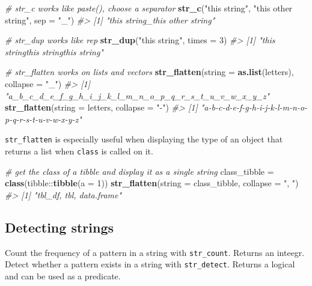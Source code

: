 \documentclass[]{book}
\newenvironment{Shaded}{}{}
\newcommand{\CommentTok}[1]{\textcolor[rgb]{0.38,0.63,0.69}{\textit{#1}}}
\newcommand{\DataTypeTok}[1]{\textcolor[rgb]{0.56,0.13,0.00}{#1}}
\newcommand{\DecValTok}[1]{\textcolor[rgb]{0.25,0.63,0.44}{#1}}
\newcommand{\KeywordTok}[1]{\textcolor[rgb]{0.00,0.44,0.13}{\textbf{#1}}}
\newcommand{\NormalTok}[1]{#1}
\newcommand{\OperatorTok}[1]{\textcolor[rgb]{0.40,0.40,0.40}{#1}}
\newcommand{\StringTok}[1]{\textcolor[rgb]{0.25,0.44,0.63}{#1}}
\begin{document}
\begin{Shaded}
\begin{Highlighting}[]
\CommentTok{# str_c works like paste(), choose a separator}
\KeywordTok{str_c}\NormalTok{(}\StringTok{"this string"}\NormalTok{, }\StringTok{"this other string"}\NormalTok{, }\DataTypeTok{sep =} \StringTok{"_"}\NormalTok{)}
\CommentTok{#> [1] "this string_this other string"}

\CommentTok{# str_dup works like rep}
\KeywordTok{str_dup}\NormalTok{(}\StringTok{"this string"}\NormalTok{, }\DataTypeTok{times =} \DecValTok{3}\NormalTok{)}
\CommentTok{#> [1] "this stringthis stringthis string"}

\CommentTok{# str_flatten works on lists and vectors}
\KeywordTok{str_flatten}\NormalTok{(}\DataTypeTok{string =} \KeywordTok{as.list}\NormalTok{(letters), }\DataTypeTok{collapse =} \StringTok{"_"}\NormalTok{)}
\CommentTok{#> [1] "a_b_c_d_e_f_g_h_i_j_k_l_m_n_o_p_q_r_s_t_u_v_w_x_y_z"}
\KeywordTok{str_flatten}\NormalTok{(}\DataTypeTok{string =}\NormalTok{ letters, }\DataTypeTok{collapse =} \StringTok{"-"}\NormalTok{)}
\CommentTok{#> [1] "a-b-c-d-e-f-g-h-i-j-k-l-m-n-o-p-q-r-s-t-u-v-w-x-y-z"}
\end{Highlighting}
\end{Shaded}

\texttt{str\_flatten} is especially useful when displaying the type of an object that returns a list when \texttt{class} is called on it.

\begin{Shaded}
\begin{Highlighting}[]
\CommentTok{# get the class of a tibble and display it as a single string}
\NormalTok{class_tibble =}\StringTok{ }\KeywordTok{class}\NormalTok{(tibble}\OperatorTok{::}\KeywordTok{tibble}\NormalTok{(}\DataTypeTok{a =} \DecValTok{1}\NormalTok{))}
\KeywordTok{str_flatten}\NormalTok{(}\DataTypeTok{string =}\NormalTok{ class_tibble, }\DataTypeTok{collapse =} \StringTok{", "}\NormalTok{)}
\CommentTok{#> [1] "tbl_df, tbl, data.frame"}
\end{Highlighting}
\end{Shaded}

\hypertarget{detecting-strings}{%
\subsection{Detecting strings}\label{detecting-strings}}

Count the frequency of a pattern in a string with \texttt{str\_count}. Returns an inteegr.
Detect whether a pattern exists in a string with \texttt{str\_detect}. Returns a logical and can be used as a predicate.
\end{document}
